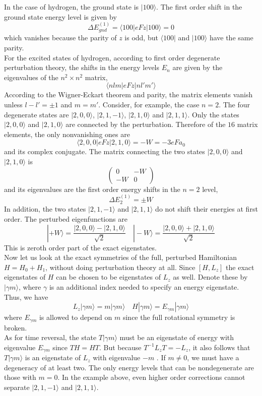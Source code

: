 In the case of hydrogen, the ground state is $|100\rangle$. The first order shift in the ground state energy level is given by
\[\Delta E^{(1)}_{gnd} = \langle 100 | eFz | 100\rangle = 0\]
which vanishes because the parity of $z$ is odd, but $\langle 100 |$ and $| 100\rangle$ have the same parity.\\
For the excited states of hydrogen, according to first order degenerate perturbation theory, the shifts in the energy levels $E_n$ are given by the eigenvalues of the $n^2\times n^2$ matrix,
\[\langle nlm | eFz | nl'm'\rangle\]
According to the Wigner-Eckart theorem and parity, the matrix elements vanish unless $l -l' = \pm 1$ and $m = m'$. Consider, for example, the case $n=2$. The four degenerate states are  $|2,0,0\rangle$, $|2,1,-1\rangle$, $|2,1,0\rangle$ and $|2,1,1\rangle$. Only the states $|2,0,0\rangle$ and $|2,1,0\rangle$ are connected by the perturbation. Therefore of the $16$ matrix elements, the only nonvanishing ones are
\[\langle 2,0,0 | eFz | 2,1,0\rangle = -W = -3eFa_0\]
and its complex conjugate. The matrix connecting the two states $|2,0,0\rangle$ and $|2,1,0\rangle$ is
\[\begin{pmatrix}0 & -W \\ -W & 0\end{pmatrix} \]
and its eigenvalues are the first order energy shifts in the $n=2$ level,
\[\Delta E_2^{(1)} = \pm W\]
In addition, the two states $|2,1,-1\rangle$ and $|2,1,1\rangle$ do not shift their energies at first order. The perturbed eigenfunctions are
\[|+W\rangle = \frac{|2,0,0\rangle - |2,1,0\rangle}{\sqrt{2}} \quad |-W\rangle = \frac{|2,0,0\rangle + |2,1,0\rangle}{\sqrt{2}}\]
This is zeroth order part of the exact eigenstates.\\
Now let us look at the exact symmetries of the full, perturbed Hamiltonian $ H = H_0 + H_1$, without doing perturbation theory at all. Since $[H,L_z]$ the exact eigenstates of $H$ can be chosen to be eigenstates of $L_z$ as well.
Denote these by $|\gamma m \rangle$, where $\gamma$ is an additional index needed to specify an energy
eigenstate. Thus, we have
\[L_z |\gamma m \rangle = m |\gamma m \rangle \quad H |\gamma m \rangle = E_{\gamma m} |\gamma m \rangle\]
where $E_{\gamma m}$ is allowed to depend on $m$ since the full rotational symmetry is broken. \\
As for time reversal, the state $T|\gamma m\rangle$ must be an eigenstate of energy with eigenvalue $E_{\gamma m}$ since $TH = HT$. But because $T^{-1}L_zT = -L_z$, it also follows that $T|\gamma m\rangle$ is an eigenstate of $L_z$ with eigenvalue $-m$ . If $m \neq 0$, we must have a degeneracy of at least two. 
The only energy levels that can be nondegenerate are those with $m=0$. In the example above, even higher order corrections cannot separate $|2,1,-1\rangle$ and $|2,1,1\rangle$.

